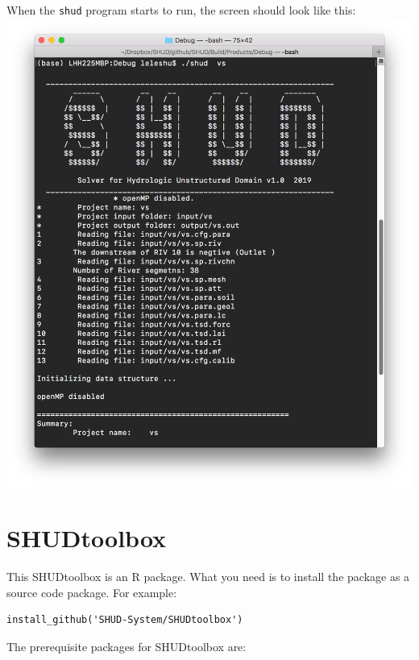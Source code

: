 \documentclass[]{scrbook}
\begin{document}
When the \texttt{shud} program starts to run, the screen should look
like this: \includegraphics{Fig/CLI_vs.png}

\section{SHUDtoolbox}\label{shudtoolbox}

This SHUDtoolbox is an R package. What you need is to install the
package as a source code package. For example:

\begin{verbatim}
install_github('SHUD-System/SHUDtoolbox')
\end{verbatim}

The prerequisite packages for SHUDtoolbox are:
\end{document}
